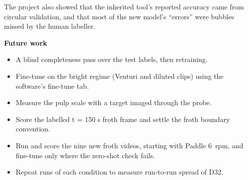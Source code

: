 The project also showed that the inherited tool's reported accuracy came
from circular validation, and that most of the new model's ``errors''
were bubbles missed by the human labeller.

\textbf{Future work}

\begin{itemize}
\tightlist
\item
  A blind completeness pass over the test labels, then retraining.
\item
  Fine-tune on the bright regime (Venturi and diluted clips) using the
  software's fine-tune tab.
\item
  Measure the pulp scale with a target imaged through the probe.
\item
  Score the labelled t = 150 s froth frame and settle the froth boundary
  convention.
\item
  Run and score the nine new froth videos, starting with Paddle 6~rpm,
  and fine-tune only where the zero-shot check fails.
\item
  Repeat runs of each condition to measure run-to-run spread of D32.
\end{itemize}
